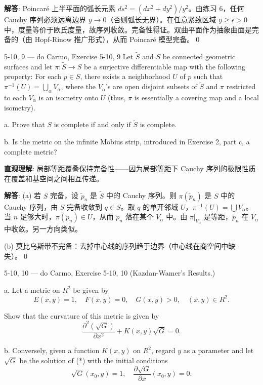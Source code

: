 \begin{Remark}
\begin{solution}
\textbf{解答}: Poincaré 上半平面的弧长元素 $ds^2=(dx^2+dy^2)/y^2$。由练习 6，任何 Cauchy 序列必须远离边界 $y\to 0$（否则弧长无界）。在任意紧致区域 $y\geq\epsilon>0$ 中，度量等价于欧氏度量，故序列收敛。完备性得证。双曲平面作为抽象曲面是完备的（由 Hopf-Rinow 推广形式），从而 Poincaré 模型完备。\qed
\end{solution}

\begin{exercise}{5-10, 9 — do Carmo, Exercise 5-10, 9}
Let $\tilde{S}$ and $S$ be connected geometric surfaces and let $\pi \colon \tilde{S} \to S$ be a surjective differentiable map with the following property: For each $p \in S$, there exists a neighborhood $U$ of $p$ such that $\pi^{-1}(U) = \bigcup_{\alpha} V_{\alpha}$, where the $V_{\alpha}$'s are open disjoint subsets of $\tilde{S}$ and $\pi$ restricted to each $V_{\alpha}$ is an isometry onto $U$ (thus, $\pi$ is essentially a covering map and a local isometry).

a. Prove that $S$ is complete if and only if $\tilde{S}$ is complete.

b. Is the metric on the infinite Möbius strip, introduced in Exercise 2, part c, a complete metric?
\end{exercise}
\begin{solution}
\textbf{直观理解}: 局部等距覆叠保持完备性——因为局部等距下 Cauchy 序列的极限性质在覆盖和基空间之间相互传递。

\textbf{解答}: (a) 若 $S$ 完备，设 $\tilde{p}_n$ 是 $\tilde{S}$ 中的 Cauchy 序列。则 $\pi(\tilde{p}_n)$ 是 $S$ 中的 Cauchy 序列，由 $S$ 完备收敛到 $q\in S$。取 $q$ 的单开邻域 $U$，$\pi^{-1}(U)=\bigcup V_\alpha$。当 $n$ 足够大时，$\pi(\tilde{p}_n)\in U$，从而 $\tilde{p}_n$ 落在某个 $V_\alpha$ 中。由 $\pi|_{V_\alpha}$ 是等距，$\tilde{p}_n$ 在 $V_\alpha$ 中收敛。另一方向类似。

(b) 莫比乌斯带不完备：去掉中心线的序列趋于边界（中心线在商空间中缺失）。\qed
\end{solution}

\begin{exercise}{5-10, 10 — do Carmo, Exercise 5-10, 10}
(Kazdan-Wamer's Results.)

a. Let a metric on $R^2$ be given by
\[
E (x, y) = 1, \quad F (x, y) = 0, \quad G (x, y) > 0, \quad (x, y) \in R ^ {2}.
\]

Show that the curvature of this metric is given by
\[
\frac {\partial^ {2} (\sqrt {G})}{\partial x ^ {2}} + K (x, y) \sqrt {G} = 0. \tag{*}
\]

b. Conversely, given a function $K(x,y)$ on $R^2$, regard $y$ as a parameter and let $\sqrt{G}$ be the solution of (*) with the initial conditions
\[
\sqrt {G} (x _ {0}, y) = 1, \quad \frac {\partial \sqrt {G}}{\partial x} (x _ {0}, y) = 0.
\]


\end{exercise}
\end{Remark}
